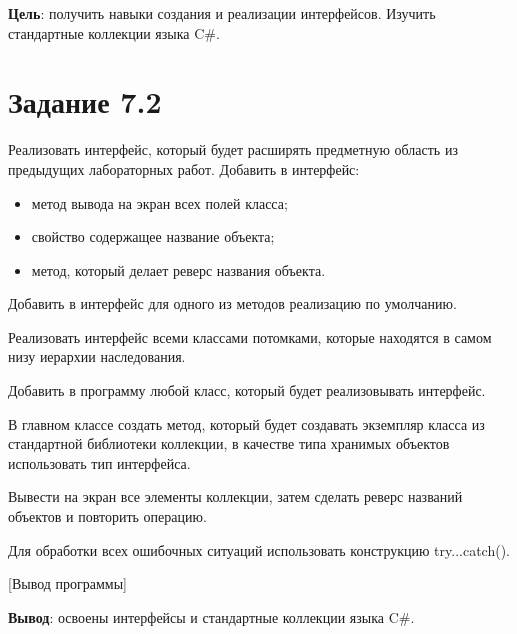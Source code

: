 \documentclass{bsuir}
\newcommand{\csharp}{C{\liberationrm\#}}
\begin{document}
    \maketitle

    \textbf{Цель}: получить навыки создания и реализации интерфейсов. Изучить
    стандартные коллекции языка \csharp.

    \section*{Задание 7.2}

    Реализовать интерфейс, который будет расширять предметную область из
    предыдущих лабораторных работ. Добавить в интерфейс:
  
    \begin{itemize}
        \item метод вывода на экран всех полей класса;
        \item свойство содержащее название объекта;
        \item метод, который делает реверс названия объекта.
    \end{itemize}
    
    Добавить в интерфейс для одного из методов реализацию по умолчанию.
  
    Реализовать интерфейс всеми классами потомками, которые находятся в самом
    низу иерархии наследования.
  
    Добавить в программу любой класс, который будет реализовывать интерфейс.
  
    В главном классе создать метод, который будет создавать экземпляр класса из
    стандартной библиотеки коллекции, в качестве типа хранимых объектов
    использовать тип интерфейса.
  
    Вывести на экран все элементы коллекции, затем сделать реверс названий
    объектов и повторить операцию.
  
    Для обработки всех ошибочных ситуаций использовать конструкцию
    try...catch().
  

    [Вывод программы]

    \textbf{Вывод}: освоены интерфейсы и стандартные коллекции языка \csharp.
\end{document}
